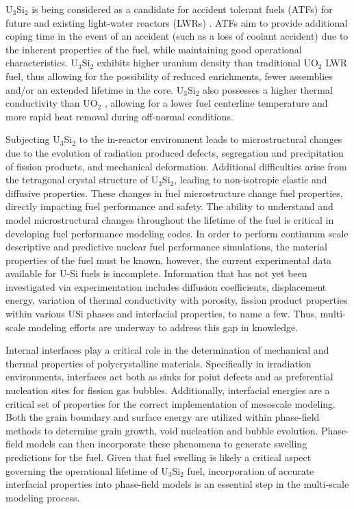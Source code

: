 \documentclass[review]{elsarticle}
\begin{document}
U$_{3}$Si$_{2}$ is being considered as a candidate for accident tolerant fuels (ATFs) for future and existing light-water reactors (LWRs) \cite{zinkle2014, zinkle2016}. ATFs aim to provide additional coping time in the event of an accident (such as a loss of coolant accident) due to the inherent properties of the fuel, while maintaining good operational characteristics. U$_{3}$Si$_{2}$ exhibits higher uranium density than traditional UO$_{2}$ LWR fuel, thus allowing for the possibility of reduced enrichments, fewer assemblies and/or an extended lifetime in the core. U$_{3}$Si$_{2}$ also possesses a higher thermal conductivity than UO$_{2}$ \cite{antonio2018}, allowing for a lower fuel centerline temperature and more rapid heat removal during off-normal conditions. 

Subjecting U$_{3}$Si$_{2}$ to the in-reactor environment leads to microstructural changes due to the evolution of radiation produced defects, segregation and precipitation of fission products, and mechanical deformation. Additional difficulties arise from the tetragonal crystal structure of U$_{3}$Si$_{2}$, leading to non-isotropic elastic and diffusive properties. These changes in fuel microstructure change fuel properties, directly impacting fuel performance and safety. The ability to understand and model microstructural changes throughout the lifetime of the fuel is critical in developing fuel performance modeling codes. In order to perform continuum scale descriptive and predictive nuclear fuel performance simulations, the material properties of the fuel must be known, however, the current experimental data available for U-Si fuels is incomplete. Information that has not yet been investigated via experimentation includes diffusion coefficients, displacement energy, variation of thermal conductivity with porosity, fission product properties within various USi phases and interfacial properties, to name a few. Thus, multi-scale modeling efforts are underway to address this gap in knowledge.

Internal interfaces play a critical role in the determination of mechanical and thermal properties of polycrystalline materials. Specifically in irradiation environments, interfaces act both as sinks for point defects and as preferential nucleation sites for fission gas bubbles. Additionally, interfacial energies are a critical set of properties for the correct implementation of mesoscale modeling. Both the grain boundary and surface energy are utilized within phase-field methods to determine grain growth, void nucleation and bubble evolution. Phase-field models can then incorporate these phenomena to generate swelling predictions for the fuel. Given that fuel swelling is likely a critical aspect governing the operational lifetime of U$_{3}$Si$_{2}$ fuel, incorporation of accurate interfacial properties into phase-field models is an essential step in the multi-scale modeling process\cite{marmot_assess, tonks2011marmot}.
\end{document}

